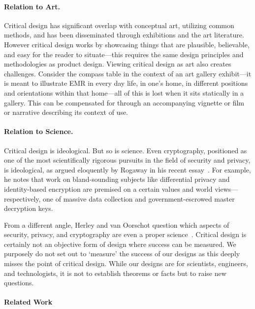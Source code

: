 \paragraph{Relation to Art.} 

Critical design has significant overlap with conceptual art, utilizing common methods, and has been disseminated through exhibitions and the art literature. However critical design works by showcasing things that are plausible, believable, and easy for the reader to situate---this requires the same design principles and methodologies as product design. Viewing critical design as art also creates challenges. Consider the compass table in the context of an art gallery exhibit---it is meant to illustrate EMR in every day life, in one's home, in different positions and orientations within that home---all of this is lost when it sits statically in a gallery. This can be compensated for through an accompanying vignette or film or narrative describing its context of use.

\paragraph{Relation to Science.} 

Critical design is ideological. But so is science. Even cryptography, positioned as one of the most scientifically rigorous pursuits in the field of security and privacy, is ideological, as argued eloquently by Rogaway in his recent essay~\cite{Rog15}. For example, he notes that work on bland-sounding subjects like differential privacy and identity-based encryption are premised on a certain values and world views---respectively, one of massive data collection and government-escrowed master decryption keys. 

From a different angle, Herley and van Oorschot question which aspects of security, privacy, and cryptography are even a proper science~\cite{HvO17}. Critical design is certainly not an objective form of design where success can be measured. We purposely do not set out to `measure' the success of our designs as this deeply misses the point of critical design. While our designs are for scientists, engineers, and technologists, it is not to establish theorems or facts but to raise new questions.

\paragraph{Related Work}

